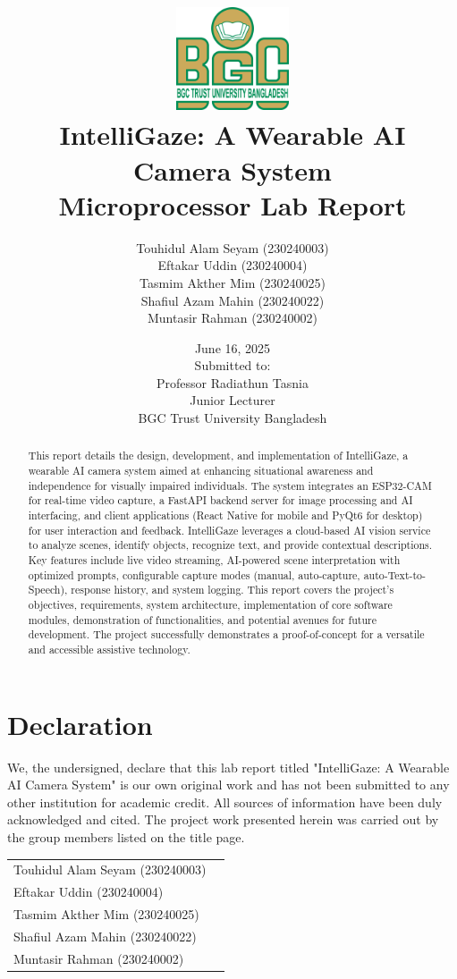 \documentclass[12pt, a4paper]{report}
\title{
    \centering %
    \includegraphics[width=0.25\textwidth]{fig/bgc-logo.png} \\ %
    \vspace{1cm} %
    \textbf{IntelliGaze: A Wearable AI Camera System} \\
    \vspace{0.5cm}
    \large Microprocessor Lab Report
}
\author{
    Touhidul Alam Seyam (230240003) \\
    Eftakar Uddin (230240004) \\
    Tasmim Akther Mim (230240025) \\
    Shafiul Azam Mahin (230240022) \\
    Muntasir Rahman (230240002)
}
\date{June 16, 2025 \\ \vspace{1cm} Submitted to: \\ Professor Radiathun Tasnia \\ Junior Lecturer \\ BGC Trust University Bangladesh}
\begin{document}
\maketitle
\newpage

\begin{abstract}
This report details the design, development, and implementation of IntelliGaze, a wearable AI camera system aimed at enhancing situational awareness and independence for visually impaired individuals. The system integrates an ESP32-CAM for real-time video capture, a FastAPI backend server for image processing and AI interfacing, and client applications (React Native for mobile and PyQt6 for desktop) for user interaction and feedback. IntelliGaze leverages a cloud-based AI vision service to analyze scenes, identify objects, recognize text, and provide contextual descriptions. Key features include live video streaming, AI-powered scene interpretation with optimized prompts, configurable capture modes (manual, auto-capture, auto-Text-to-Speech), response history, and system logging. This report covers the project's objectives, requirements, system architecture, implementation of core software modules, demonstration of functionalities, and potential avenues for future development. The project successfully demonstrates a proof-of-concept for a versatile and accessible assistive technology.
\end{abstract}
\newpage

\section*{Declaration}
We, the undersigned, declare that this lab report titled "IntelliGaze: A Wearable AI Camera System" is our own original work and has not been submitted to any other institution for academic credit. All sources of information have been duly acknowledged and cited. The project work presented herein was carried out by the group members listed on the title page.

\vspace{1cm}
\begin{tabular}{ll}
\vspace{1cm}
Touhidul Alam Seyam (230240003) & \underline{\hspace{5cm}} \\
\vspace{1cm}
Eftakar Uddin (230240004) & \underline{\hspace{5cm}} \\
\vspace{1cm}
Tasmim Akther Mim (230240025) & \underline{\hspace{5cm}} \\
\vspace{1cm}
Shafiul Azam Mahin (230240022) & \underline{\hspace{5cm}} \\
\vspace{1cm}
Muntasir Rahman (230240002) & \underline{\hspace{5cm}} \\
\end{tabular}
\vspace{1cm}
\end{document}
